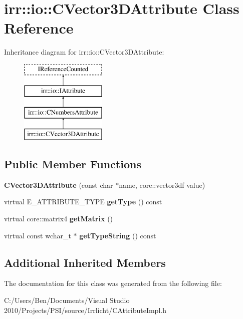 \hypertarget{classirr_1_1io_1_1_c_vector3_d_attribute}{\section{irr\-:\-:io\-:\-:C\-Vector3\-D\-Attribute Class Reference}
\label{classirr_1_1io_1_1_c_vector3_d_attribute}
}
Inheritance diagram for irr\-:\-:io\-:\-:C\-Vector3\-D\-Attribute\-:\begin{figure}[H]
\begin{center}
\leavevmode
\includegraphics[height=4.000000cm]{classirr_1_1io_1_1_c_vector3_d_attribute}
\end{center}
\end{figure}
\subsection*{Public Member Functions}
\begin{DoxyCompactItemize}
\item 
\hypertarget{classirr_1_1io_1_1_c_vector3_d_attribute_a09e1f3428e7b1ae1f4529400dd111e9d}{{\bfseries C\-Vector3\-D\-Attribute} (const char $\ast$name, core\-::vector3df value)}\label{classirr_1_1io_1_1_c_vector3_d_attribute_a09e1f3428e7b1ae1f4529400dd111e9d}

\item 
\hypertarget{classirr_1_1io_1_1_c_vector3_d_attribute_a6e22e575ace2ead17ca3d3354b43cbc9}{virtual E\-\_\-\-A\-T\-T\-R\-I\-B\-U\-T\-E\-\_\-\-T\-Y\-P\-E {\bfseries get\-Type} () const }\label{classirr_1_1io_1_1_c_vector3_d_attribute_a6e22e575ace2ead17ca3d3354b43cbc9}

\item 
\hypertarget{classirr_1_1io_1_1_c_vector3_d_attribute_a1976c5358e48d9b482dd4043fc7b2efe}{virtual core\-::matrix4 {\bfseries get\-Matrix} ()}\label{classirr_1_1io_1_1_c_vector3_d_attribute_a1976c5358e48d9b482dd4043fc7b2efe}

\item 
\hypertarget{classirr_1_1io_1_1_c_vector3_d_attribute_ad0a79854cd2442be898ccf6555593493}{virtual const wchar\-\_\-t $\ast$ {\bfseries get\-Type\-String} () const }\label{classirr_1_1io_1_1_c_vector3_d_attribute_ad0a79854cd2442be898ccf6555593493}

\end{DoxyCompactItemize}
\subsection*{Additional Inherited Members}


The documentation for this class was generated from the following file\-:\begin{DoxyCompactItemize}
\item 
C\-:/\-Users/\-Ben/\-Documents/\-Visual Studio 2010/\-Projects/\-P\-S\-I/source/\-Irrlicht/C\-Attribute\-Impl.\-h\end{DoxyCompactItemize}
